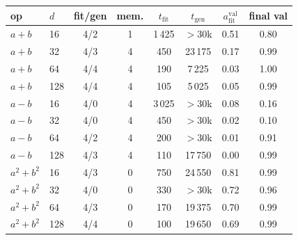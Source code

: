 \begin{tabular}{llcccccc}
\toprule
op & $d$ & fit/gen & mem. & $t_{\mathrm{fit}}$ & $t_{\mathrm{gen}}$ & $a^{\mathrm{val}}_{\mathrm{fit}}$ & final val\\
\midrule
$a+b$ & 16 & 4/2 & 1 & 1\,425 & $>$30k & 0.51 & 0.80 \\
$a+b$ & 32 & 4/3 & 4 & 450 & 23\,175 & 0.17 & 0.99 \\
$a+b$ & 64 & 4/4 & 4 & 190 & 7\,225 & 0.03 & 1.00 \\
$a+b$ & 128 & 4/4 & 4 & 105 & 5\,025 & 0.05 & 0.99 \\
$a-b$ & 16 & 4/0 & 4 & 3\,025 & $>$30k & 0.08 & 0.16 \\
$a-b$ & 32 & 4/0 & 4 & 450 & $>$30k & 0.02 & 0.10 \\
$a-b$ & 64 & 4/2 & 4 & 200 & $>$30k & 0.01 & 0.91 \\
$a-b$ & 128 & 4/3 & 4 & 110 & 17\,750 & 0.00 & 0.99 \\
$a^2+b^2$ & 16 & 4/3 & 0 & 750 & 24\,550 & 0.81 & 0.99 \\
$a^2+b^2$ & 32 & 4/0 & 0 & 330 & $>$30k & 0.72 & 0.96 \\
$a^2+b^2$ & 64 & 4/3 & 0 & 170 & 19\,375 & 0.70 & 0.99 \\
$a^2+b^2$ & 128 & 4/4 & 0 & 100 & 19\,650 & 0.69 & 0.99 \\
\bottomrule
\end{tabular}
